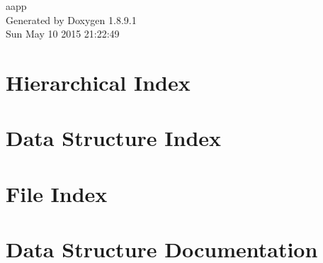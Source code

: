 \documentclass[twoside]{book}
\newcommand{\+}{\discretionary{\mbox{\scriptsize$\hookleftarrow$}}{}{}}
\newcommand{\clearemptydoublepage}{%
  \newpage{\pagestyle{empty}\cleardoublepage}%
}
\begin{document}
\hypersetup{pageanchor=false,
             bookmarks=true,
             bookmarksnumbered=true,
             pdfencoding=unicode
            }
\begin{titlepage}
\vspace*{7cm}
\begin{center}%
{\Large aapp }\\
\vspace*{1cm}
{\large Generated by Doxygen 1.8.9.1}\\
\vspace*{0.5cm}
{\small Sun May 10 2015 21:22:49}\\
\end{center}
\end{titlepage}
\clearemptydoublepage
\tableofcontents
\clearemptydoublepage
{}
\hypersetup{pageanchor=true}

\chapter{Hierarchical Index}

\chapter{Data Structure Index}

\chapter{File Index}

\chapter{Data Structure Documentation}































\end{document}
